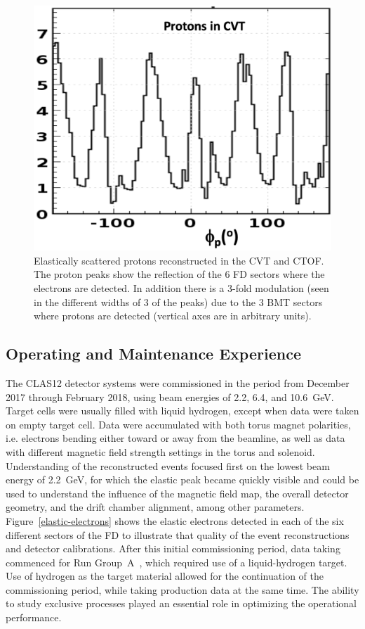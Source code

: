 \documentclass[final,3p,twocolumn]{elsarticle}
\begin{document}
\begin{figure}[ht]
\vspace{0.3cm}\centerline{\includegraphics[width=0.8\columnwidth]{CVT-elastic-protons.png}}
\caption{Elastically scattered protons reconstructed in the CVT and CTOF. The proton peaks show the reflection of
  the 6 FD sectors where the electrons are detected. In addition there is a 3-fold modulation (seen in the different
  widths of 3 of the peaks) due to the 3 BMT sectors where protons are detected (vertical axes are in arbitrary units).}
\label{CVT-elastic-protons}
\end{figure}

\subsection{Operating and Maintenance Experience}

The CLAS12 detector systems were commissioned in the period from December 2017 through February 2018, using
beam energies of 2.2, 6.4, and 10.6~GeV. Target cells were usually filled with liquid hydrogen, except when data were taken on
empty target cell. Data were accumulated with both torus magnet polarities, i.e. electrons
bending either toward or away from the beamline, as well as data with different magnetic field strength settings
in the torus and solenoid. Understanding of the reconstructed events focused first on the lowest beam energy of
2.2~GeV, for which the elastic peak became quickly visible and could be used to understand the influence of the
magnetic field map, the overall detector geometry, and the drift chamber alignment, among other parameters.
Figure~\ref{elastic-electrons} shows the elastic electrons detected in each of the six different sectors of the FD
to illustrate that quality of the event reconstructions and detector calibrations. After this initial commissioning
period, data taking commenced for Run Group~A~\cite{rg-details}, which required use of a liquid-hydrogen target.
Use of hydrogen as the target material allowed for the continuation of the commissioning period, while taking
production data at the same time. The ability to study exclusive processes played an essential role in optimizing
the operational performance. 
\end{document}

